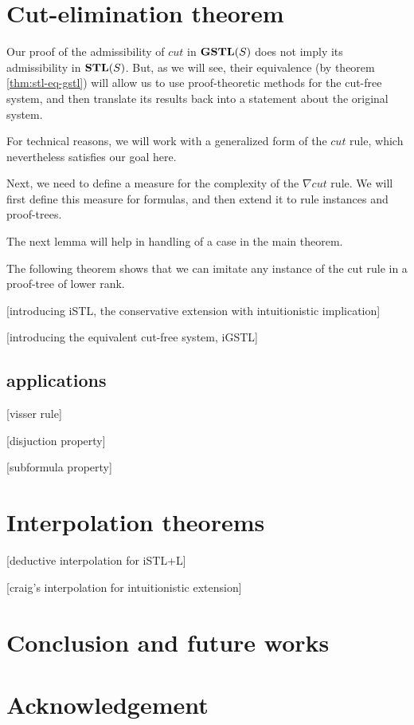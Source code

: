 \documentclass[12pt,a4paper]{article}
\begin{document}


\section{Cut-elimination theorem}
Our proof of the admissibility of $cut$ in $\mathbf{GSTL}(S)$ does not imply its admissibility in $\mathbf{STL}(S)$. But, as we will see, their equivalence (by theorem \ref{thm:stl-eq-gstl}) will allow us to use proof-theoretic methods for the cut-free system, and then translate its results back into a statement about the original system.

For technical reasons, we will work with a generalized form of the $cut$ rule, which nevertheless satisfies our goal here.





Next, we need to define a measure for the complexity of the $\nabla cut$ rule. We will first define this measure for formulas, and then extend it to rule instances and proof-trees.



The next lemma will help in handling of a case in the main theorem.



The following theorem shows that we can imitate any instance of the cut rule in a proof-tree of lower rank.



[introducing iSTL, the conservative extension with intuitionistic implication]

[introducing the equivalent cut-free system, iGSTL]

\subsection{applications}
[visser rule]

[disjuction property]

[subformula property]

\section{Interpolation theorems}
[deductive interpolation for iSTL+L]

[craig's interpolation for intuitionistic extension]

\section{Conclusion and future works}

\section{Acknowledgement}



\end{document}
